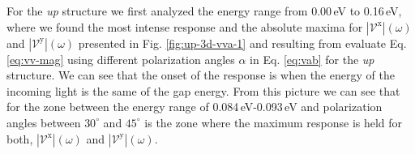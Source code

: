 \documentclass[prb,11pt,tightenlines,twocolumn,aps]{revtex4-1}
\begin{document}
For the \emph{up} structure we first analyzed the energy range from 0.00\,eV to
0.16\,eV, where we found the most intense response and the absolute maxima for
$|\mathcal{V}^{\mathrm{x}}|(\omega)$ and $|\mathcal{V}^{\mathrm{y}}|(\omega)$
presented in Fig. \ref{fig:up-3d-vva-1} and resulting from evaluate Eq.
\eqref{eq:vv-mag} using different polarization angles $\alpha$ in Eq.
\eqref{eq:vab} for the \emph{up} structure. We can see that the onset of the
response is when the energy of the incoming light is the same of the gap energy.
%
From this picture we can see that for the zone between the energy range of
0.084\,eV-0.093\,eV and polarization angles between $30^{\circ}$ and
$45^{\circ}$ is the zone where the maximum response is held for both,
$|\mathcal{V}^{\mathrm{x}}|(\omega)$ and $|\mathcal{V}^{\mathrm{y}}|(\omega)$.
\end{document}
